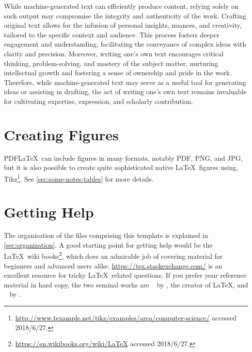 \begin{displayquote}\small
  While machine-generated text can efficiently produce content, relying solely on such output may compromise the integrity and authenticity of the work. Crafting original text allows for the infusion of personal insights, nuances, and creativity, tailored to the specific context and audience. This process fosters deeper engagement and understanding, facilitating the conveyance of complex ideas with clarity and precision. Moreover, writing one's own text encourages critical thinking, problem-solving, and mastery of the subject matter, nurturing intellectual growth and fostering a sense of ownership and pride in the work. Therefore, while machine-generated text may serve as a useful tool for generating ideas or assisting in drafting, the act of writing one's own text remains invaluable for cultivating expertise, expression, and scholarly contribution.
\end{displayquote}

\section*{Creating Figures}
\label{sec:creating-figures}

PDF\LaTeX\ can include figures in many formats, notably \acs{PDF}, \acs{PNG}, and \acs{JPG}, but it is also possible to create quite sophisticated native \LaTeX\ figures using, \eg Tikz\footnote{\url{http://www.texample.net/tikz/examples/area/computer-science/} accessed 2018/6/27.}. See \autoref{sec:some-notes-tables} for more details.

\section*{Getting Help}
\label{sec:getting-help}
The organisation of the files comprising this template is explained in \autoref{sec:organization}.
A good starting point for getting help would be the \LaTeX\ wiki books\footnote{\url{https://en.wikibooks.org/wiki/LaTeX} accessed 2018/6/27.}, which does an admirable job of covering material for beginners and advanced users
alike.
\url{https://tex.stackexchange.com/} is an excellent resource for tricky \LaTeX\ related questions.
If you prefer your reference material in hard copy, the two seminal works are ~\cite{Lamport1994:LADPSUGARM1994} by \citeauthor{Lamport1994:LADPSUGARM1994}, the creator of \LaTeX,
and ~\cite{Mittelbach2004:TLC2004} by \citeauthor{Mittelbach2004:TLC2004}.

